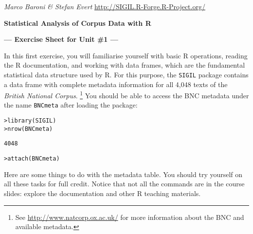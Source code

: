 \documentclass[a4paper,12pt]{article}
\begin{document}
\emph{Marco Baroni \& Stefan Evert} \hfill %
{\small \url{http://SIGIL.R-Forge.R-Project.org/}}

\begin{center}
  \textbf{\large Statistical Analysis of Corpus Data with R}

  \textbf{\large --- Exercise Sheet for Unit \#1 ---}
\end{center}

In this first exercise, you will familiarise yourself with basic R
operations, reading the R documentation, and working with data frames, which
are the fundamental statistical data structure used by R.  For this purpose,
the \texttt{SIGIL} package contains a data frame with complete metadata 
information for all 4,048 texts of the \emph{British National Corpus}.%
\footnote{See \url{http://www.natcorp.ox.ac.uk/} for more information about
  the BNC and available metadata.} %
You should be able to access the BNC metadata under the name \texttt{BNCmeta} after loading the
package:

\begin{alltt}
    > library(SIGIL)
    > nrow(BNCmeta)    \begin{Rout}
    [1] 4048 \end{Rout}
    > attach(BNCmeta)  
\end{alltt}

Here are some things to do with the metadata table.  You should try yourself
on all these tasks for full credit. Notice that not all the commands are in
the course slides: explore the documentation and other R teaching materials.
\end{document}
